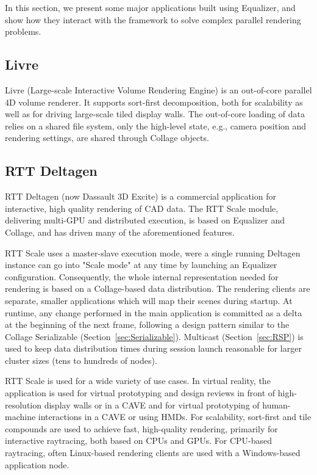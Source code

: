 \documentclass[10pt,journal,compsoc]{IEEEtran}
\newcommand{\sref}[1]{Section~\ref{#1}}
\begin{document}
In this section, we present some major applications built using Equalizer, and
show how they interact with the framework to solve complex parallel rendering
problems.

\subsection{Livre}

Livre (Large-scale Interactive Volume Rendering Engine) is an out-of-core
parallel 4D volume renderer. It supports sort-first decomposition, both for
scalability as well as for driving large-scale tiled display walls. The
out-of-core loading of data relies on a shared file system, only the high-level
state, e.g., camera position and rendering settings, are shared through Collage
objects.

\subsection{RTT Deltagen}

RTT Deltagen (now Dassault 3D Excite) is a commercial application for
interactive, high quality rendering of CAD data. The RTT Scale module,
delivering multi-GPU and distributed execution, is based on Equalizer and
Collage, and has driven many of the aforementioned features.

RTT Scale uses a master-slave execution mode, were a single running Deltagen
instance can go into "Scale mode" at any time by launching an Equalizer
configuration. Consequently, the whole internal representation needed for
rendering is based on a Collage-based data distribution. The rendering clients
are separate, smaller applications which will map their scenes during
startup. At runtime, any change performed in the main application is committed
as a delta at the beginning of the next frame, following a design pattern
similar to the Collage \textsf{Serializable}
(\sref{sec:Serializable}). Multicast (\sref{sec:RSP}) is used to keep data
distribution times during session launch reasonable for larger cluster sizes
(tens to hundreds of nodes).

RTT Scale is used for a wide variety of use cases. In virtual reality, the
application is used for virtual prototyping and design reviews in front of
high-resolution display walls or in a CAVE and for virtual prototyping of
human-machine interactions in a CAVE or using HMDs. For scalability, sort-first
and tile compounds are used to achieve fast, high-quality rendering, primarily
for interactive raytracing, both based on CPUs and GPUs. For CPU-based
raytracing, often Linux-based rendering clients are used with a Windows-based
application node.
\end{document}
